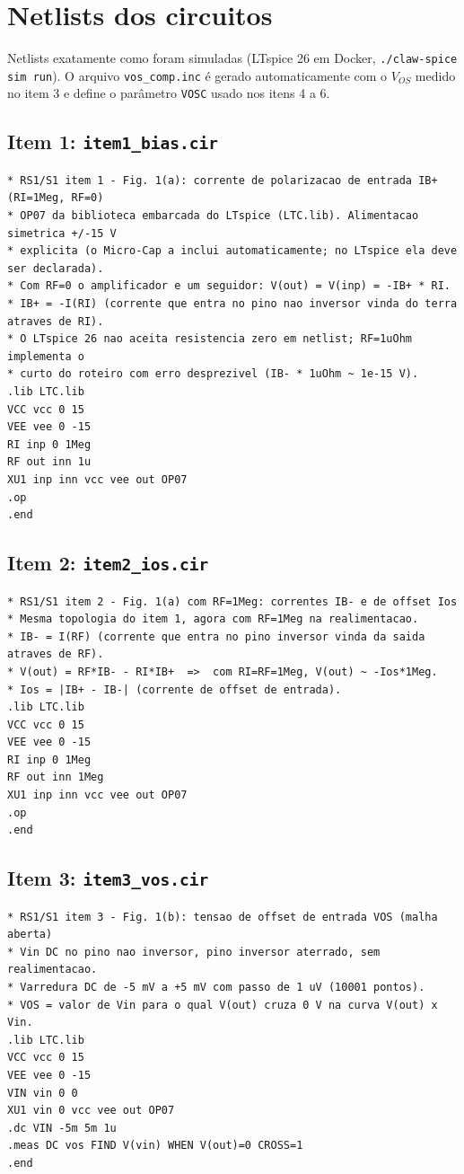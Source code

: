 \appendix

\section{Netlists dos circuitos}
\label{ap:netlist}

Netlists exatamente como foram simuladas (LTspice 26 em Docker,
\texttt{./claw-spice sim run}). O arquivo \texttt{vos\_comp.inc} é
gerado automaticamente com o $V_{OS}$ medido no item 3 e define o
parâmetro \texttt{VOSC} usado nos itens 4 a 6.

\subsection*{Item 1: \texttt{item1\_bias.cir}}
{\small
\begin{verbatim}
* RS1/S1 item 1 - Fig. 1(a): corrente de polarizacao de entrada IB+ (RI=1Meg, RF=0)
* OP07 da biblioteca embarcada do LTspice (LTC.lib). Alimentacao simetrica +/-15 V
* explicita (o Micro-Cap a inclui automaticamente; no LTspice ela deve ser declarada).
* Com RF=0 o amplificador e um seguidor: V(out) = V(inp) = -IB+ * RI.
* IB+ = -I(RI) (corrente que entra no pino nao inversor vinda do terra atraves de RI).
* O LTspice 26 nao aceita resistencia zero em netlist; RF=1uOhm implementa o
* curto do roteiro com erro desprezivel (IB- * 1uOhm ~ 1e-15 V).
.lib LTC.lib
VCC vcc 0 15
VEE vee 0 -15
RI inp 0 1Meg
RF out inn 1u
XU1 inp inn vcc vee out OP07
.op
.end
\end{verbatim}
}

\subsection*{Item 2: \texttt{item2\_ios.cir}}
{\small
\begin{verbatim}
* RS1/S1 item 2 - Fig. 1(a) com RF=1Meg: correntes IB- e de offset Ios
* Mesma topologia do item 1, agora com RF=1Meg na realimentacao.
* IB- = I(RF) (corrente que entra no pino inversor vinda da saida atraves de RF).
* V(out) = RF*IB- - RI*IB+  =>  com RI=RF=1Meg, V(out) ~ -Ios*1Meg.
* Ios = |IB+ - IB-| (corrente de offset de entrada).
.lib LTC.lib
VCC vcc 0 15
VEE vee 0 -15
RI inp 0 1Meg
RF out inn 1Meg
XU1 inp inn vcc vee out OP07
.op
.end
\end{verbatim}
}

\subsection*{Item 3: \texttt{item3\_vos.cir}}
{\small
\begin{verbatim}
* RS1/S1 item 3 - Fig. 1(b): tensao de offset de entrada VOS (malha aberta)
* Vin DC no pino nao inversor, pino inversor aterrado, sem realimentacao.
* Varredura DC de -5 mV a +5 mV com passo de 1 uV (10001 pontos).
* VOS = valor de Vin para o qual V(out) cruza 0 V na curva V(out) x Vin.
.lib LTC.lib
VCC vcc 0 15
VEE vee 0 -15
VIN vin 0 0
XU1 vin 0 vcc vee out OP07
.dc VIN -5m 5m 1u
.meas DC vos FIND V(vin) WHEN V(out)=0 CROSS=1
.end
\end{verbatim}
}

